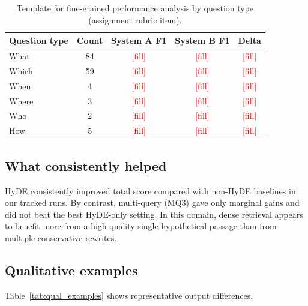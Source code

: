 \documentclass[11pt,twocolumn]{article}
\begin{document}
\begin{table}[t]
\centering
\small
\begin{tabular}{l c c c c}
\toprule
\textbf{Question type} & \textbf{Count} & \textbf{System A F1} & \textbf{System B F1} & \textbf{Delta} \\
\midrule
What & 84 & \textcolor{red}{[fill]} & \textcolor{red}{[fill]} & \textcolor{red}{[fill]} \\
Which & 59 & \textcolor{red}{[fill]} & \textcolor{red}{[fill]} & \textcolor{red}{[fill]} \\
When & 4 & \textcolor{red}{[fill]} & \textcolor{red}{[fill]} & \textcolor{red}{[fill]} \\
Where & 3 & \textcolor{red}{[fill]} & \textcolor{red}{[fill]} & \textcolor{red}{[fill]} \\
Who & 2 & \textcolor{red}{[fill]} & \textcolor{red}{[fill]} & \textcolor{red}{[fill]} \\
How & 5 & \textcolor{red}{[fill]} & \textcolor{red}{[fill]} & \textcolor{red}{[fill]} \\
\bottomrule
\end{tabular}
\caption{Template for fine-grained performance analysis by question type (assignment rubric item).}
\label{tab:typewise_template}
\end{table}

\subsection{What consistently helped}
HyDE consistently improved total score compared with non-HyDE baselines in our tracked runs. By contrast, multi-query (MQ3) gave only marginal gains and did not beat the best HyDE-only setting. In this domain, dense retrieval appears to benefit more from a high-quality single hypothetical passage than from multiple conservative rewrites.

\subsection{Qualitative examples}
Table~\ref{tab:qual_examples} shows representative output differences.
\end{document}
